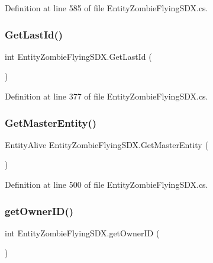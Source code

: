 Definition at line 585 of file Entity\+Zombie\+Flying\+S\+D\+X.\+cs.

\mbox{\label{class_entity_zombie_flying_s_d_x_a92f4b99e9b7366a229190910ed73837d}} 
\subsubsection{\texorpdfstring{GetLastId()}{GetLastId()}}
{\footnotesize\ttfamily int Entity\+Zombie\+Flying\+S\+D\+X.\+Get\+Last\+Id (\begin{DoxyParamCaption}{ }\end{DoxyParamCaption})}



Definition at line 377 of file Entity\+Zombie\+Flying\+S\+D\+X.\+cs.

\mbox{\label{class_entity_zombie_flying_s_d_x_a9e38e779f52882038b18ba6411ade1af}} 
\subsubsection{\texorpdfstring{GetMasterEntity()}{GetMasterEntity()}}
{\footnotesize\ttfamily Entity\+Alive Entity\+Zombie\+Flying\+S\+D\+X.\+Get\+Master\+Entity (\begin{DoxyParamCaption}{ }\end{DoxyParamCaption})}



Definition at line 500 of file Entity\+Zombie\+Flying\+S\+D\+X.\+cs.

\mbox{\label{class_entity_zombie_flying_s_d_x_a646ef36c07bb0e9139c111deaf0ea0e7}} 
\subsubsection{\texorpdfstring{getOwnerID()}{getOwnerID()}}
{\footnotesize\ttfamily int Entity\+Zombie\+Flying\+S\+D\+X.\+get\+Owner\+ID (\begin{DoxyParamCaption}{ }\end{DoxyParamCaption})}



